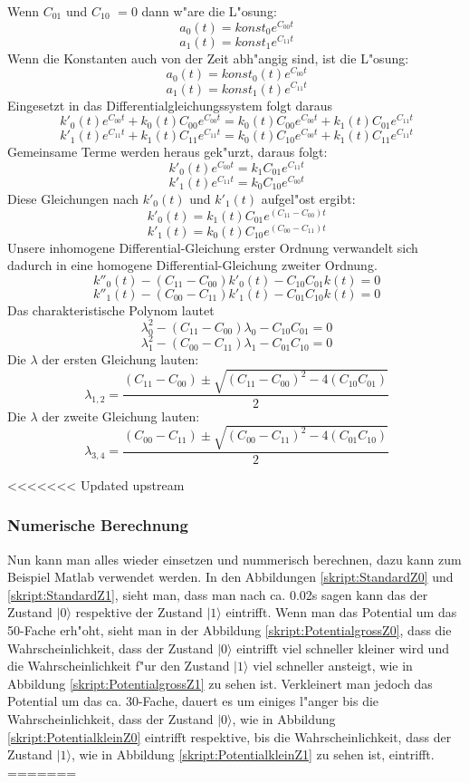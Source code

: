 \begin{refsection}
Wenn $ C_{01}$ und $ C_{10}$ $ =0$ dann w"are die L"osung:
\[
\ a_{0}(t) = \text{$konst_{0}$} e^{C_{00} t} 
\]
\[
\ a_{1}(t) = \text{$konst_{1}$} e^{C_{11} t}
\]
Wenn die Konstanten auch von der Zeit abh"angig sind, ist die L"osung: 
\[
\ a_{0}(t) = \text{$konst_{0}(t)$} e^{C_{00} t} 
\]
\[
\ a_{1}(t) = \text{$konst_{1}(t)$} e^{C_{11} t} 
\]
Eingesetzt in das Differentialgleichungssystem folgt daraus
\[
\ k'_{0}(t) e^{C_{00} t} + k_{0}(t) C_{00} e^{C_{00} t} = k_{0}(t) C_{00} e^{C_{00} t} + k_{1}(t)C_{01}e^{C_{11} t}
\]
\[
\ k'_{1}(t) e^{C_{11} t} + k_{1}(t) C_{11} e^{C_{11} t} = k_{0}(t) C_{10} e^{C_{00} t} + k_{1}(t)C_{11}e^{C_{11} t}
\]
Gemeinsame Terme werden heraus gek"urzt, daraus folgt:
\[
\ k'_{0}(t) e^{C_{00} t} = k_{1} C_{01} e^{C_{11} t}
\]
\[
\ k'_{1}(t) e^{C_{11} t} = k_{0} C_{10} e^{C_{00} t}
\]
Diese Gleichungen nach $ k'_{0}(t)$ und $ k'_{1}(t)$ aufgel"ost ergibt:
\[
\ k'_{0}(t) = k_{1}(t) C_{01} e^{(C_{11}-C_{00}) t}
\]
\[
\ k'_{1}(t) = k_{0}(t) C_{10} e^{(C_{00}-C_{11}) t}
\]
Unsere inhomogene Differential-Gleichung erster Ordnung verwandelt sich dadurch in eine homogene Differential-Gleichung zweiter Ordnung.
\[ 
\ k''_{0}(t) - (C_{11}-C_{00}) k'_{0}(t) - C_{10}C_{01}k(t) = 0
\]
\[
\ k''_{1}(t) - (C_{00}-C_{11}) k'_{1}(t) - C_{01}C_{10}k(t) = 0
\]
Das charakteristische Polynom lautet
\[
\ \lambda_{0}^{2} - (C_{11}-C_{00})\lambda_{0} - C_{10}C_{01} = 0
\]
\[
\ \lambda_{1}^{2} - (C_{00}-C_{11})\lambda_{1} - C_{01}C_{10} = 0
\]
Die $ \lambda $ der ersten Gleichung lauten:
\[
\ \lambda_{1,2} = \frac{(C_{11}-C_{00})\pm \sqrt{(C_{11}-C_{00})^2-4(C_{10}C_{01})}}{2}
\]
Die $ \lambda $ der zweite Gleichung lauten:
\[
\ \lambda_{3,4} = \frac{(C_{00}-C_{11})\pm \sqrt{(C_{00}-C_{11})^2-4(C_{01}C_{10})}}{2}
\]

<<<<<<< Updated upstream
\subsubsection{Numerische Berechnung}
Nun kann man alles wieder einsetzen und nummerisch berechnen, dazu kann zum Beispiel Matlab verwendet werden.
In den Abbildungen \ref{skript:StandardZ0} und \ref{skript:StandardZ1}, sieht man, dass man nach ca. 0.02s sagen kann das der Zustand $|0\rangle$ respektive der Zustand $|1\rangle$ eintrifft. Wenn man das Potential um das 50-Fache erh"oht, sieht man in der Abbildung \ref{skript:PotentialgrossZ0}, dass die Wahrscheinlichkeit, dass der Zustand $|0\rangle$ eintrifft viel schneller kleiner wird und die Wahrscheinlichkeit f"ur den Zustand $|1\rangle$ viel schneller ansteigt, wie in Abbildung \ref{skript:PotentialgrossZ1} zu sehen ist. Verkleinert man jedoch das Potential um das ca. 30-Fache, dauert es um einiges l"anger bis die Wahrscheinlichkeit, dass der Zustand $|0\rangle$, wie in Abbildung \ref{skript:PotentialkleinZ0} eintrifft respektive, bis die Wahrscheinlichkeit, dass der Zustand $|1\rangle$, wie in Abbildung \ref{skript:PotentialkleinZ1} zu sehen ist, eintrifft. 
=======

\end{refsection}
